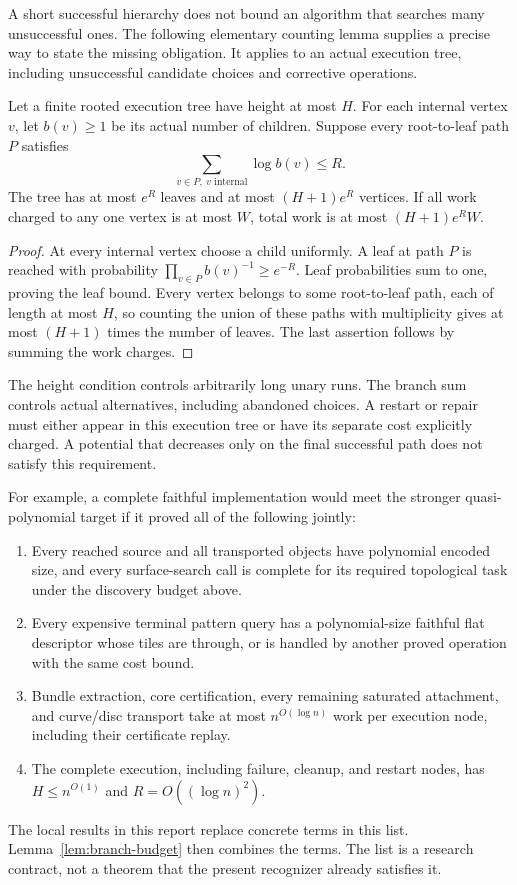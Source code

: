 A short successful hierarchy does not bound an algorithm that searches many
unsuccessful ones. The following elementary counting lemma supplies a precise
way to state the missing obligation. It applies to an actual execution tree,
including unsuccessful candidate choices and corrective operations.

\begin{lemma}\label{lem:branch-budget}
Let a finite rooted execution tree have height at most $H$. For each internal
vertex $v$, let $b(v)\geq1$ be its actual number of children. Suppose every
root-to-leaf path $P$ satisfies
\[
 \sum_{v\in P,\ v\text{ internal}}\log b(v)\leq R.
\]
The tree has at most $e^R$ leaves and at most $(H+1)e^R$ vertices.
If all work charged to any one vertex is at most $W$, total work is at most
$(H+1)e^R W$.
\end{lemma}
\begin{proof}
At every internal vertex choose a child uniformly. A leaf at path $P$ is
reached with probability $\prod_{v\in P}b(v)^{-1}\geq e^{-R}$. Leaf
probabilities sum to one, proving the leaf bound. Every vertex belongs to
some root-to-leaf path, each of length at most $H$, so counting the union of
these paths with multiplicity gives at most $(H+1)$ times the number of
leaves. The last assertion follows by summing the work charges.
\end{proof}

The height condition controls arbitrarily long unary runs. The branch sum
controls actual alternatives, including abandoned choices. A restart or
repair must either appear in this execution tree or have its separate cost
explicitly charged. A potential that decreases only on the final successful
path does not satisfy this requirement.

For example, a complete faithful implementation would meet the stronger
quasi-polynomial target if it proved all of the following jointly:
\begin{enumerate}
\item Every reached source and all transported objects have polynomial
encoded size, and every surface-search call is complete for its required
topological task under the discovery budget above.
\item Every expensive terminal pattern query has a polynomial-size faithful
flat descriptor whose tiles are through, or is handled by another proved
operation with the same cost bound.
\item Bundle extraction, core certification, every remaining saturated
attachment, and curve/disc transport take at most $n^{O(\log n)}$ work per
execution node, including their certificate replay.
\item The complete execution, including failure, cleanup, and restart nodes,
has $H\leq n^{O(1)}$ and $R=O((\log n)^2)$.
\end{enumerate}
The local results in this report replace concrete terms in this list.
Lemma~\ref{lem:branch-budget} then combines the terms. The list is a research
contract, not a theorem that the present recognizer already satisfies it.

